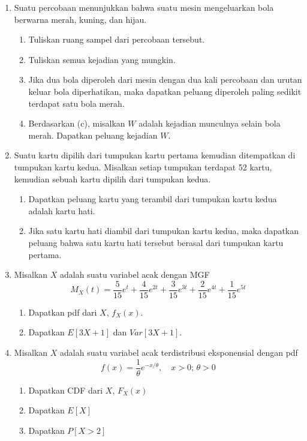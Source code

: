 \documentclass[11pt,letterpaper]{article}
\begin{document}
\vspace{0.25cm}
\noindent
\begin{enumerate}
  \item Suatu percobaan menunjukkan bahwa suatu mesin mengeluarkan bola berwarna merah, kuning, dan hijau.
        \begin{enumerate}[label=\alph*.]
          \item Tuliskan ruang sampel dari percobaan tersebut.
          \item Tuliskan semua kejadian yang mungkin.
          \item Jika dua bola diperoleh dari mesin dengan dua kali percobaan dan urutan keluar bola diperhatikan, maka dapatkan peluang diperoleh paling sedikit terdapat satu bola merah.
          \item Berdasarkan (c), misalkan $W$ adalah kejadian munculnya selain bola merah. Dapatkan peluang kejadian $W$.
        \end{enumerate}
        \vspace{0.3cm}

  \item Suatu kartu dipilih dari tumpukan kartu pertama kemudian ditempatkan di tumpukan kartu kedua. Misalkan setiap tumpukan terdapat 52 kartu, kemudian sebuah kartu dipilih dari tumpukan kedua.
        \begin{enumerate}[label=\alph*.]
          \item Dapatkan peluang kartu yang terambil dari tumpukan kartu kedua adalah kartu hati.
          \item Jika satu kartu hati diambil dari tumpukan kartu kedua, maka dapatkan peluang bahwa satu kartu hati tersebut berasal dari tumpukan kartu pertama.
        \end{enumerate}
        \vspace{0.3cm}

  \item Misalkan $X$ adalah suatu variabel acak dengan MGF
        \[ M_X(t) = \dfrac{5}{15}e^t + \dfrac{4}{15}e^{2t} + \dfrac{3}{15}e^{3t} + \dfrac{2}{15}e^{4t} + \dfrac{1}{15}e^{5t} \]
        \begin{enumerate}[label=\alph*.]
          \item Dapatkan pdf dari $X$, $f_X(x)$.
          \item Dapatkan $E[3X + 1]$ dan $Var[3X + 1]$.
        \end{enumerate}
        \vspace{0.3cm}

  \item Misalkan $X$ adalah suatu variabel acak terdistribusi eksponensial dengan pdf
        \[ f(x) = \dfrac{1}{\theta}e^{-x/\theta}, \quad x > 0; \, \theta > 0 \]
        \begin{enumerate}[label=\alph*.]
          \item Dapatkan CDF dari $X$, $F_X(x)$
          \item Dapatkan $E[X]$
          \item Dapatkan $P[X > 2]$
        \end{enumerate}
        \vspace{0.3cm}


\end{enumerate}
\end{document}
